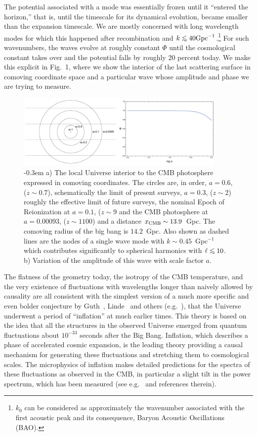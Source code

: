 \documentclass[psfig,12pt]{article}
\def\ni{\noindent}
\def\lo{\mathrel{\raise.3ex\hbox{$<$}\mkern-14mu\lower0.6ex\hbox{$\sim$}}}
\begin{document}
The potential associated with a mode was essentially frozen until it
``entered the horizon,'' that is, until the timescale for its dynamical
evolution, became smaller than the expansion timescale. We are mostly
concerned with long wavelength modes for which this happened after
recombination and $k\lo40{\rm Gpc}^{-1}$.\footnote{$k_0$ can be
considered as approximately the wavenumber associated with the first
acoustic peak and its consequence, Baryon Acoustic Oscillations (BAO).}
For such wavenumbers, the waves evolve at roughly constant $\Phi$ until
the cosmological constant takes over and the potential falls by roughly
20 percent today. We make this explicit in Fig.~1, where we show the
interior of the last scattering surface in comoving coordinate space and
a particular wave whose amplitude and phase we are trying to measure.
\begin{figure}[t]
\centering
\includegraphics[width=4in]{figures/nsffig1.pdf}
\caption{ \openup -0.3em
\footnotesize{a) The local Universe interior to the CMB photosphere
expressed in comoving coordinates. The circles are, in order, $a=0.6$,
($z\sim0.7$), schematically the limit of present surveys, $a=0.3$,
($z\sim2$) roughly the effective limit of future surveys, the nominal
Epoch of Reionization at $a=0.1$, ($z\sim9$ and the CMB photosphere at
$a=0.00093$, ($z\sim1100$) and a distance $x_{\rm CMB}\sim13.9$~Gpc. The
comoving radius of the big bang is $14.2$~Gpc. Also shown as dashed
lines are the nodes of a single wave mode with $k\sim0.45$~Gpc$^{-1}$
which contributes significantly to spherical harmonics with $\ell\lo10$.
b) Variation of the amplitude of this wave with scale factor $a$.}}
\end{figure}

\ni{\bf The Inflation of Our Universe:} The flatness of the geometry today, the isotropy of
the CMB temperature, and the very existence of fluctuations with
wavelengths longer than naively allowed by causality are all consistent
with the simplest version of a much more specific and even bolder
conjecture by Guth~\cite{Guth1981}, Linde~\cite{Linde1982a} and others
(e.g.~\cite{Mukhanov:1981xt, Sato1981, Hawking1982, Starobinsky1982,
Albrecht1982, Bardeen1983}), that the Universe underwent a period of
``inflation'' at much earlier times. This theory is based on the idea
that all the structures in the observed Universe emerged from quantum
fluctuations about $10^{-33}$ seconds after the Big Bang. Inflation,
which describes a phase of accelerated cosmic expansion, is the leading
theory providing a causal mechanism for generating these fluctuations
and stretching them to cosmological scales. The microphysics of
inflation makes detailed predictions for the spectra of these
fluctuations as observed in the CMB, in particular a slight tilt in the
power spectrum, which has been measured (see e.g.~\cite{Malik2008,
Gordon2000} and references therein).
\end{document}
